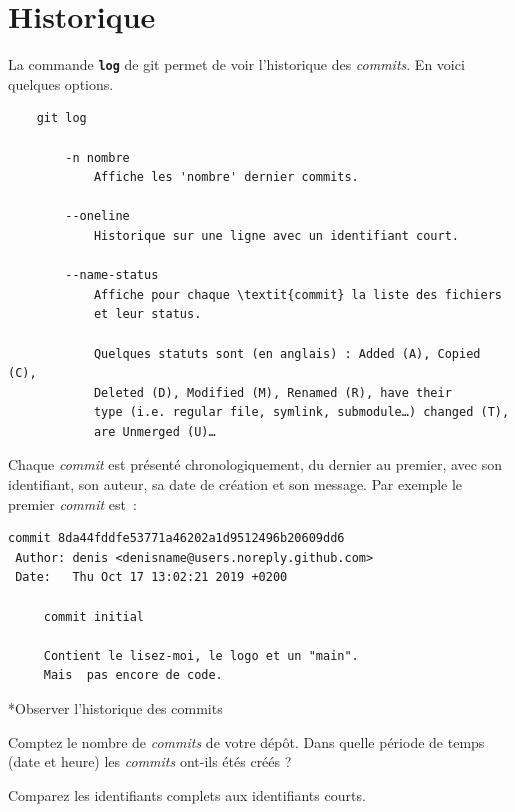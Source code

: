\documentclass[a4paper,11pt]{style-esi/td}
\begin{document}
\section{Historique}

La commande \texttt{\textbf{log}} de git permet de voir l'historique des
\textit{commits}. En voici quelques options. 

\begin{colxbox}[colback=white,drop fuzzy shadow]
\begin{verbatim}
	git log
	
	    -n nombre
	        Affiche les 'nombre' dernier commits.

	    --oneline
	        Historique sur une ligne avec un identifiant court.

	    --name-status
	        Affiche pour chaque \textit{commit} la liste des fichiers 
	        et leur status.

	        Quelques statuts sont (en anglais) : Added (A), Copied (C), 
	        Deleted (D), Modified (M), Renamed (R), have their 
	        type (i.e. regular file, symlink, submodule…) changed (T), 
	        are Unmerged (U)…
\end{verbatim}
\end{colxbox}
\bigskip

Chaque \textit{commit} est présenté chronologiquement, du dernier au premier,
avec son identifiant, son auteur, sa date de création et son message. Par
exemple le premier \textit{commit} est~:

\begin{verbatim}
commit 8da44fddfe53771a46202a1d9512496b20609dd6
 Author: denis <denisname@users.noreply.github.com>
 Date:   Thu Oct 17 13:02:21 2019 +0200
 
     commit initial
     
     Contient le lisez-moi, le logo et un "main".
     Mais  pas encore de code.

\end{verbatim}

\pagebreak[4]
\begin{Exercice}*{Observer l'historique des commits}
	\begin{steps}
		
	\item Comptez le nombre de \textit{commits} de votre dépôt. Dans quelle
		période de temps (date et heure) les \textit{commits} ont-ils étés
		créés ? 

	\item Comparez les identifiants complets aux identifiants courts.

	\end{steps}
\end{Exercice}
\end{document}
